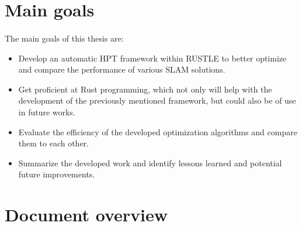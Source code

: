 \section{Main goals}
\paragraph{}The main goals of this thesis are:
\begin{itemize}
    \item Develop an automatic \ac{HPT} framework within \ac{RUSTLE} to better optimize and compare the performance of various \ac{SLAM} solutions.
    \item Get proficient at Rust programming, which not only will help with the development of the previously mentioned framework, but could also be of use in future works.
    \item Evaluate the efficiency of the developed optimization algorithms and compare them to each other.
    \item Summarize the developed work and identify lessons learned and potential future improvements.
\end{itemize}
\section{Document overview}